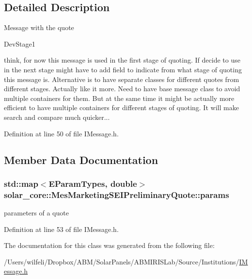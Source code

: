 \subsection{Detailed Description}
Message with the quote

\begin{DoxyRefDesc}{Dev\+Stage1}
\item[\hyperlink{_dev_stage1__DevStage1000007}{Dev\+Stage1}]think, for now this message is used in the first stage of quoting. If decide to use in the next stage might have to add field to indicate from what stage of quoting this message is. Alternative is to have separate classes for different quotes from different stages. Actually like it more. Need to have base message class to avoid multiple containers for them. But at the same time it might be actually more efficient to have multiple containers for different stages of quoting. It will make search and compare much quicker...\end{DoxyRefDesc}


Definition at line 50 of file I\+Message.\+h.



\subsection{Member Data Documentation}
\hypertarget{classsolar__core_1_1_mes_marketing_s_e_i_preliminary_quote_abe529e6fd227f28d2aab0c6df56e998d}{}
\subsubsection[{params}]{\setlength{\rightskip}{0pt plus 5cm}std\+::map$<${\bf E\+Param\+Types}, double$>$ solar\+\_\+core\+::\+Mes\+Marketing\+S\+E\+I\+Preliminary\+Quote\+::params}\label{classsolar__core_1_1_mes_marketing_s_e_i_preliminary_quote_abe529e6fd227f28d2aab0c6df56e998d}
parameters of a quote 

Definition at line 53 of file I\+Message.\+h.



The documentation for this class was generated from the following file\+:\begin{DoxyCompactItemize}
\item 
/\+Users/wilfeli/\+Dropbox/\+A\+B\+M/\+Solar\+Panels/\+A\+B\+M\+I\+R\+I\+S\+Lab/\+Source/\+Institutions/\hyperlink{_i_message_8h}{I\+Message.\+h}\end{DoxyCompactItemize}
